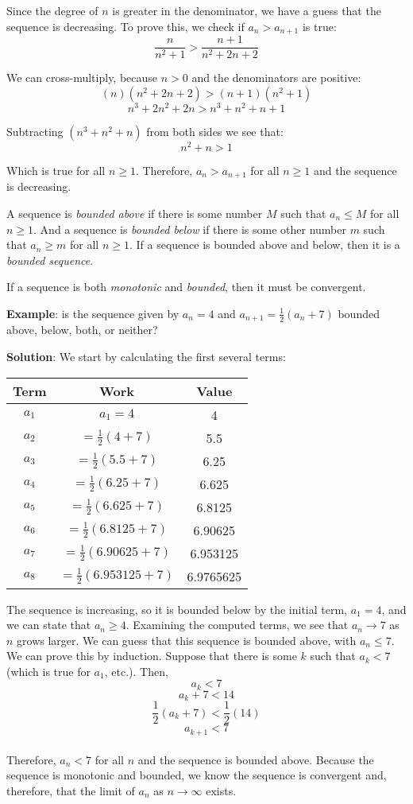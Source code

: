 Since the degree of $n$ is greater in the denominator, we have a guess that 
the sequence is decreasing. To prove this, we check if $a_n > a_{n+1}$ is true:
$$\frac{n}{n^2 + 1} > \frac{n + 1}{n^2 + 2n + 2}$$

We can cross-multiply, because $n > 0$ and the denominators are positive:
$$(n)(n^2 + 2n + 2) > (n+1)(n^2 + 1)$$
$$n^3 + 2n^2 + 2n > n^3 + n^2 + n + 1$$

Subtracting $(n^3 + n^2 + n)$ from both sides we see that:
$$n^2 + n > 1$$

Which is true for all $n \geq1$. Therefore, $a_n > a_{n+1}$ for all $n \geq 1$ 
and the sequence is decreasing. 

A sequence is \textit{bounded above} if there is some number $M$ such that 
$a_n \leq M$ for all $n \geq 1$. And a sequence is \textit{bounded below} if 
there is some other number $m$ such that $a_n \geq m$ for all $n \geq 1$. If a 
sequence is bounded above and below, then it is a \textit{bounded sequence}. 

If a sequence is both \textit{monotonic} and \textit{bounded}, then it must be 
convergent. 

\textbf{Example}: is the sequence given by $a_n = 4$ and $a_{n+1} = \frac{1}{2} 
(a_n + 7)$ bounded above, below, both, or neither?

\textbf{Solution}: We start by calculating the first several terms:
\begin{center}
	\begin{tabular}{|c|c|c|}\hline
	Term & Work & Value\\
	\hline
	$a_1$ & $a_1 = 4$ & 4\\
	\hline
	$a_2$ & $=\frac{1}{2}(4 + 7)$ & 5.5\\
	\hline
	$a_3$ & $=\frac{1}{2}(5.5+7)$ & 6.25\\
	\hline
	$a_4$ & $=\frac{1}{2}(6.25+7)$ & 6.625\\
	\hline
	$a_5$ & $=\frac{1}{2}(6.625+7)$ & 6.8125\\
	\hline
	$a_6$ & $=\frac{1}{2}(6.8125+7)$ & 6.90625\\
	\hline
	$a_7$ & $=\frac{1}{2}(6.90625+7)$ & 6.953125\\
	\hline
	$a_8$ & $=\frac{1}{2}(6.953125+7)$ & 6.9765625\\
	\hline	
	\end{tabular}
\end{center}

The sequence is increasing, so it is bounded below by the initial term, $a_1 = 
4$, and we can state that $a_n \geq 4$. Examining the computed terms, we see 
that $a_n \to 7$ as $n$ grows larger. We can guess that this sequence is 
bounded above, with $a_n \leq 7$. We can prove this by induction. Suppose that 
there is some $k$ such that $a_k < 7$ (which is true for $a_1$, etc.). Then,
$$a_k < 7$$
$$a_k + 7 < 14$$
$$\frac{1}{2}(a_k + 7) < \frac{1}{2}(14)$$
$$a_{k + 1} < 7$$\\
Therefore, $a_n < 7$ for all $n$ and the sequence is bounded above. Because 
the sequence is monotonic and bounded, we know the sequence is convergent and, 
therefore, that the limit of $a_n$ as $n \to \infty$ exists. 

